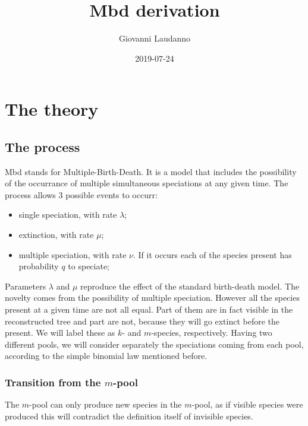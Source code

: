 \documentclass[]{article}
\title{Mbd derivation}
\author{Giovanni Laudanno}
\date{2019-07-24}
\providecommand{\tightlist}{%
  \setlength{\itemsep}{0pt}\setlength{\parskip}{0pt}}
\begin{document}
\maketitle

{
\setcounter{tocdepth}{2}
\tableofcontents
}
\hypertarget{the-theory}{%
\section{The theory}\label{the-theory}}

\hypertarget{the-process}{%
\subsection{The process}\label{the-process}}

Mbd stands for Multiple-Birth-Death. It is a model that includes the possibility
of the occurrance of multiple simultaneous speciations at any given time.
The process allows 3 possible events to occurr:

\begin{itemize}
\tightlist
\item
  single speciation, with rate \(\lambda\);
\item
  extinction, with rate \(\mu\);
\item
  multiple speciation, with rate \(\nu\). If it occurs each of the species present has probability \(q\) to speciate;
\end{itemize}

Parameters \(\lambda\) and \(\mu\) reproduce the effect of the standard birth-death
model. The novelty comes from the possibility of multiple speciation.
However all the species present at a given time are not all equal. Part of them
are in fact visible in the reconstructed tree and part are not, because they will go extinct before the
present. We will label these as \(k\)- and \(m\)-species, respectively.
Having two different pools, we will consider separately the speciations coming
from each pool, according to the simple binomial law mentioned before.

\hypertarget{transition-from-the-m-pool}{%
\subsubsection{\texorpdfstring{Transition from the \(m\)-pool}{Transition from the m-pool}}\label{transition-from-the-m-pool}}

The \(m\)-pool can only produce new species in the \(m\)-pool, as if visible species
were produced this will contradict the definition itself of invisible species.
\end{document}
